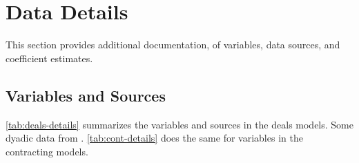 \documentclass[12pt]{article}
\begin{document}
\newpage

\section{Data Details}
\afterpage{\clearpage}
This section provides additional documentation, of variables, data sources, and coefficient estimates.  

%



\subsection{Variables and Sources}

\autoref{tab:deals-details} summarizes the variables and sources in the deals models. Some dyadic data from \citet{peacesciencer-package}. 
\autoref{tab:cont-details} does the same for variables in the contracting models. 
\end{document}

